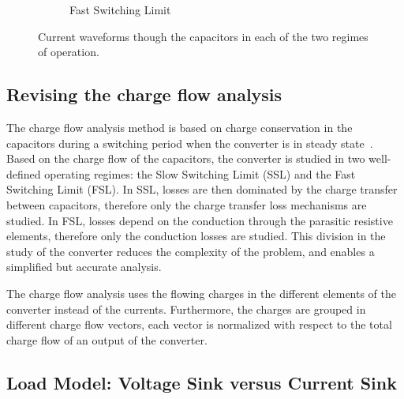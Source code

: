 \begin{figure}[!h]
\begin{subfigure}[t]{.45\textwidth}
    \caption{Fast Switching Limit}
    \label{fig:ic_fsl}
\end{subfigure}
\caption{Current waveforms though the capacitors in each of the two regimes of operation. }
\label{fig:capacitor_current}
\end{figure}


\subsection{Revising the charge flow analysis}

The charge flow analysis method is based on charge conservation in the capacitors during a switching period when the converter is in steady state~\cite{95Makowski}. Based on the charge flow of the capacitors, the converter is studied in two well-defined operating regimes: the Slow Switching Limit (SSL) and the Fast Switching Limit (FSL). In SSL, losses are then dominated by the charge transfer between capacitors, therefore only the charge transfer loss mechanisms are studied.  In FSL, losses depend on the conduction through the parasitic resistive elements, therefore only the conduction losses are studied. This division in the study of the converter reduces the complexity of the problem, and enables a simplified but accurate analysis.

The charge flow analysis uses the flowing charges in the different elements of the converter instead of the currents. Furthermore, the charges are grouped in different charge flow vectors, each vector is normalized with respect to the total charge flow of an output of the converter.


\subsection{Load Model: Voltage Sink versus Current Sink}

